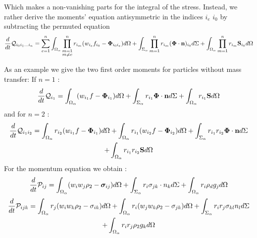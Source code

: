 Which makes a non-vanishing parts for the integral of the stress. 
Instead, we rather derive the moments' equation antisymmetric in the indices $i_e$ $i_0$ by subtracting the permuted equation
\begin{multline}
    \frac{d}{d t} \mathcal{Q}_{i_0 i_1\ldots i_n }
    = \sum_{e=1}^{n} \int_{\Omega_\alpha} \prod^{n}_{\substack{ m=1 \\   m \neq e}} r_{i_m} (w_{i_e}f_{i_0}  - \mathbf{\Phi}_{i_0 i_e})d\Omega
    +\int_{\Sigma_\alpha} \prod_{m=1}^{n} r_{i_m} (\mathbf{\Phi} \cdot \textbf{n})_{i_0}d\Sigma
    + \int_{\Omega_\alpha} \prod_{m=1}^{n} r_{i_m} \textbf{S}_{i_0} d\Omega
\end{multline}

As an example we give the two first order moments for particles without mass transfer: 
If $n=1$ : 
\begin{equation}
    \frac{d}{d t} \mathcal{Q}_{i_1}
    = \int_{\Omega_\alpha} (w_{i_1}f  - \mathbf{\Phi}_{i_1})d\Omega
    +\int_{\Sigma_\alpha} r_{i_1}\mathbf{\Phi} \cdot \textbf{n}d\Sigma
    + \int_{\Omega_\alpha}r_{i_1} \textbf{S} d\Omega
\end{equation}
and for $n=2$ : 
\begin{multline}
    \label{eq:moment_n2}
    \frac{d}{d t} \mathcal{Q}_{i_1 i_2}
    = 
    \int_{\Omega_\alpha} r_{i_2} (w_{i_1}f  - \mathbf{\Phi}_{i_1})d\Omega
    +\int_{\Omega_\alpha} r_{i_1} (w_{i_2}f  - \mathbf{\Phi}_{i_2})d\Omega
    +\int_{\Sigma_\alpha}  r_{i_1}r_{i_2} \mathbf{\Phi} \cdot \textbf{n}d\Sigma\\
    + \int_{\Omega_\alpha} r_{i_1}r_{i_2}  \textbf{S} d\Omega
\end{multline}
For the momentum equation we obtain : 
\begin{equation}
    \frac{d}{d t} \mathcal{P}_{ij}
    = \int_{\Omega_\alpha} (w_{i}w_j \rho_2  - \bm{\sigma}_{ij})d\Omega
    +\int_{\Sigma_\alpha} r_{i} \sigma_{jk} \cdot n_k d\Sigma
    + \int_{\Omega_\alpha}r_{i} \rho_d g_j d\Omega
\end{equation}
\begin{multline*}
    \frac{d}{d t} \mathcal{P}_{i j k}
    = 
    \int_{\Omega_\alpha} r_{j} (w_{i} w_k\rho_2 - \sigma_{ik})d\Omega
    +\int_{\Omega_\alpha} r_{i} (w_{j} w_k\rho_2 - \sigma_{jk})d\Omega
    +\int_{\Sigma_\alpha}  r_{i}r_{j} \sigma_{kl} n_l d\Sigma\\
    + \int_{\Omega_\alpha} r_{i}r_{j}  \rho_2 g_k d\Omega
\end{multline*}


